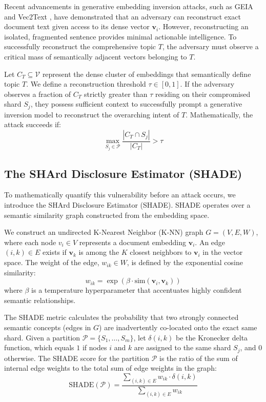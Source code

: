 Recent advancements in generative embedding inversion attacks, such as GEIA \cite{li2023geia} and Vec2Text \cite{morris2023vec2text}, have demonstrated that an adversary can reconstruct exact document text given access to its dense vector $\mathbf{v}_i$. However, reconstructing an isolated, fragmented sentence provides minimal actionable intelligence. To successfully reconstruct the comprehensive topic $T$, the adversary must observe a critical mass of semantically adjacent vectors belonging to $T$.

Let $C_T \subseteq \mathcal{V}$ represent the dense cluster of embeddings that semantically define topic $T$. We define a reconstruction threshold $\tau \in [0, 1]$. If the adversary observes a fraction of $C_T$ strictly greater than $\tau$ residing on their compromised shard $S_j$, they possess sufficient context to successfully prompt a generative inversion model to reconstruct the overarching intent of $T$. Mathematically, the attack succeeds if:
\begin{equation}
\max_{S_j \in \mathcal{P}} \frac{|C_T \cap S_j|}{|C_T|} > \tau
\end{equation}

\subsection{The SHArd Disclosure Estimator (SHADE)}
To mathematically quantify this vulnerability before an attack occurs, we introduce the SHArd Disclosure Estimator (SHADE). SHADE operates over a semantic similarity graph constructed from the embedding space.

We construct an undirected K-Nearest Neighbor (K-NN) graph $G = (V, E, W)$, where each node $v_i \in V$ represents a document embedding $\mathbf{v}_i$. An edge $(i, k) \in E$ exists if $\mathbf{v}_k$ is among the $K$ closest neighbors to $\mathbf{v}_i$ in the vector space. The weight of the edge, $w_{ik} \in W$, is defined by the exponential cosine similarity:
\begin{equation}
w_{ik} = \exp\left( \beta \cdot \text{sim}(\mathbf{v}_i, \mathbf{v}_k) \right)
\end{equation}
where $\beta$ is a temperature hyperparameter that accentuates highly confident semantic relationships.

The SHADE metric calculates the probability that two strongly connected semantic concepts (edges in $G$) are inadvertently co-located onto the exact same shard. Given a partition $\mathcal{P} = \{S_1, \dots, S_m\}$, let $\delta(i, k)$ be the Kronecker delta function, which equals $1$ if nodes $i$ and $k$ are assigned to the same shard $S_j$, and $0$ otherwise. The SHADE score for the partition $\mathcal{P}$ is the ratio of the sum of internal edge weights to the total sum of edge weights in the graph:
\begin{equation}
\text{SHADE}(\mathcal{P}) = \frac{\sum_{(i, k) \in E} w_{ik} \cdot \delta(i, k)}{\sum_{(i, k) \in E} w_{ik}}
\end{equation}

